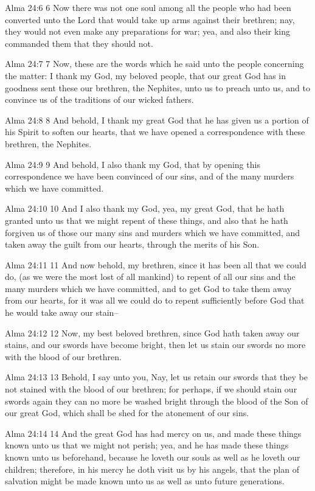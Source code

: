 Alma 24:6
 6 Now there was not one soul among all the people who had been
converted unto the Lord that would take up arms against their
brethren; nay, they would not even make any preparations for war;
yea, and also their king commanded them that they should not.

Alma 24:7
 7 Now, these are the words which he said unto the people
concerning the matter: I thank my God, my beloved people, that
our great God has in goodness sent these our brethren, the
Nephites, unto us to preach unto us, and to convince us of the
traditions of our wicked fathers.

Alma 24:8
 8 And behold, I thank my great God that he has given us a
portion of his Spirit to soften our hearts, that we have opened a
correspondence with these brethren, the Nephites.

Alma 24:9
 9 And behold, I also thank my God, that by opening this
correspondence we have been convinced of our sins, and of the
many murders which we have committed.

Alma 24:10
 10 And I also thank my God, yea, my great God, that he hath
granted unto us that we might repent of these things, and also
that he hath forgiven us of those our many sins and murders which
we have committed, and taken away the guilt from our hearts,
through the merits of his Son.

Alma 24:11
 11 And now behold, my brethren, since it has been all that we
could do, (as we were the most lost of all mankind) to repent of
all our sins and the many murders which we have committed, and to
get God to take them away from our hearts, for it was all we
could do to repent sufficiently before God that he would take
away our stain--

Alma 24:12
 12 Now, my best beloved brethren, since God hath taken away our
stains, and our swords have become bright, then let us stain our
swords no more with the blood of our brethren.

Alma 24:13
 13 Behold, I say unto you, Nay, let us retain our swords that
they be not stained with the blood of our brethren; for perhaps,
if we should stain our swords again they can no more be washed
bright through the blood of the Son of our great God, which shall
be shed for the atonement of our sins.

Alma 24:14
 14 And the great God has had mercy on us, and made these things
known unto us that we might not perish; yea, and he has made
these things known unto us beforehand, because he loveth our
souls as well as he loveth our children; therefore, in his mercy
he doth visit us by his angels, that the plan of salvation might
be made known unto us as well as unto future generations.

